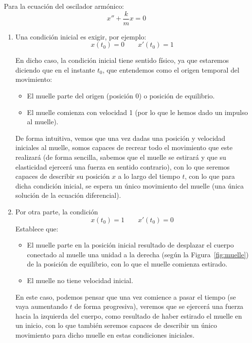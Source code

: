 \begin{ejemplo}
    Para la ecuación del oscilador armónico:
    \begin{equation*}
        x'' + \dfrac{k}{m}x = 0
    \end{equation*}

    \begin{enumerate}
        \item Una condición inicial es exigir, por ejemplo:
            \begin{equation*}
                x(t_0) = 0 \qquad x'(t_0) = 1
            \end{equation*}

            En dicho caso, la condición inicial tiene sentido físico, ya que estaremos diciendo que en el instante $t_0$, que entendemos como el origen temporal del movimiento:
            \begin{itemize}
                \item El muelle parte del origen (posición 0) o posición de equilibrio.
                \item El muelle comienza con velocidad 1 (por lo que le hemos dado un impulso al muelle).
            \end{itemize}
            De forma intuitiva, vemos que una vez dadas una posición y velocidad iniciales al muelle, somos capaces de recrear todo el movimiento que este realizará (de forma sencilla, sabemos que el muelle se estirará y que su elasticidad ejercerá una fuerza en sentido contrario), con lo que seremos capaces de describir su posición $x$ a lo largo del tiempo $t$, con lo que para dicha condición inicial, se espera un único movimiento del muelle (una única solución de la ecuación diferencial).\\

        \item Por otra parte, la condición
            \begin{equation*}
                x(t_0) = 1 \qquad x'(t_0) = 0
            \end{equation*}
            Establece que:
            \begin{itemize}
                \item El muelle parte en la posición inicial resultado de desplazar el cuerpo conectado al muelle una unidad a la derecha (según la Figura~\ref{fig:muelle}) de la posición de equilibrio, con lo que el muelle comienza estirado.
                \item El muelle no tiene velocidad inicial.
            \end{itemize}
            En este caso, podemos pensar que una vez comience a pasar el tiempo (se vaya aumentando $t$ de forma progresiva), veremos que se ejercerá una fuerza hacia la izquierda del cuerpo, como resultado de haber estirado el muelle en un inicio, con lo que también seremos capaces de describir un único movimiento para dicho muelle en estas condiciones iniciales.
    \end{enumerate}
\end{ejemplo}

